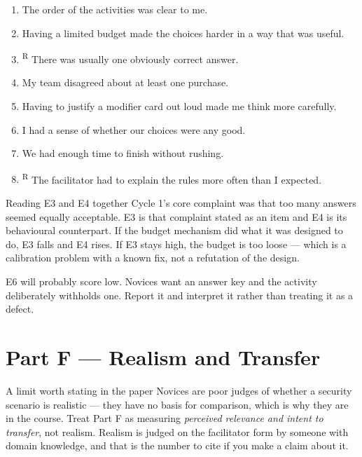 \documentclass[11pt,letterpaper]{article}
\newcommand{\R}{\textsuperscript{R}}
\begin{document}
\begin{enumerate}[label=E\arabic*.]
\item The order of the activities was clear to me.
\item Having a limited budget made the choices harder in a way that was useful.
\item\R{} There was usually one obviously correct answer.
\item My team disagreed about at least one purchase.
\item Having to justify a modifier card out loud made me think more carefully.
\item I had a sense of whether our choices were any good.
\item We had enough time to finish without rushing.
\item\R{} The facilitator had to explain the rules more often than I expected.
\end{enumerate}

\begin{note}{Reading E3 and E4 together}
Cycle 1's core complaint was that too many answers seemed equally acceptable.
E3 is that complaint stated as an item and E4 is its behavioural counterpart. If
the budget mechanism did what it was designed to do, E3 falls and E4 rises. If
E3 stays high, the budget is too loose --- which is a calibration problem with a
known fix, not a refutation of the design.

E6 will probably score low. Novices want an answer key and the activity
deliberately withholds one. Report it and interpret it rather than treating it
as a defect.
\end{note}

\section{Part F --- Realism and Transfer}

\begin{caution}{A limit worth stating in the paper}
Novices are poor judges of whether a security scenario is realistic --- they have
no basis for comparison, which is why they are in the course. Treat Part F as
measuring \emph{perceived relevance and intent to transfer}, not realism.
Realism is judged on the facilitator form by someone with domain knowledge, and
that is the number to cite if you make a claim about it.
\end{caution}
\end{document}

